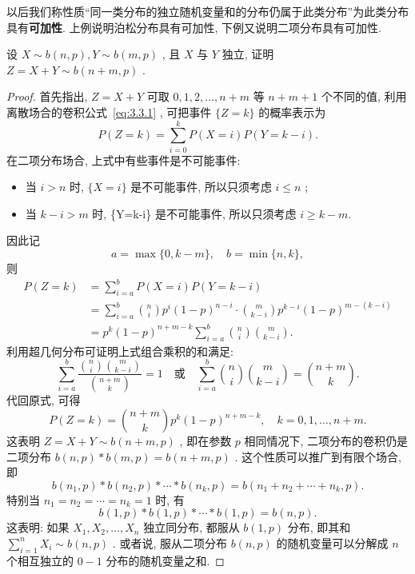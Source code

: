    以后我们称性质“同一类分布的独立随机变量和的分布仍属于此类分布”为此类分布具有{\bfseries 可加性}. 上例说明泊松分布具有可加性, 下例又说明二项分布具有可加性.
   \begin{example}[二项分布的可加性]\label{exam:3.3.3}
   	设 $X\sim b(n,p),Y\sim b(m,p)$ , 且 $X$ 与 $Y$ 独立, 证明 $Z=X+Y\sim b(n+m,p)$ .
   	\begin{proof}
   		首先指出, $Z=X+Y$ 可取 $0,1,2,\ldots,n+m$ 等 $n+m+1$ 个不同的值, 利用离散场合的卷积公式~\ref{eq:3.3.1} , 可把事件 $\{Z=k\}$ 的概率表示为
   		\begin{equation*}
   			P(Z=k)=\sum_{i=0}^{k}P(X=i)P(Y=k-i).
   		\end{equation*}
   		在二项分布场合, 上式中有些事件是不可能事件:
   		\begin{itemize}
   			\item 当 $i>n$ 时, $\{X=i\}$ 是不可能事件, 所以只须考虑 $i\leqslant n$ ;
   			\item 当 $k-i>m$ 时, \{Y=k-i\} 是不可能事件, 所以只须考虑 $i\geqslant k-m$.
   		\end{itemize}
   		因此记
   		\begin{equation*}
   			a=\max\{0,k-m\},\quad b=\min\{n,k\},
   		\end{equation*}
   		则
   		\begin{align*}
   			P(Z=k)
   			&= \sum_{i=a}^{b}P(X=i)P(Y=k-i)\\
   			&= \sum_{i=a}^{b}\binom{n}{i}p^{i}(1-p)^{n-i}\cdot\binom{m}{k-i}p^{k-i}(1-p)^{m-(k-i)}\\
   			&= p^{k}(1-p)^{n+m-k}\sum_{i=a}^{b}\binom{n}{i}\binom{m}{k-i}.
   		\end{align*}
   		利用超几何分布可证明上式组合乘积的和满足:
   		\begin{equation*}
   			\sum_{i=a}^{b}\frac{\displaystyle\binom{n}{i}\binom{m}{k-i}}{\displaystyle\binom{n+m}{k}}=1\quad\text{或}\quad\sum_{i=a}^{b}\binom{n}{i}\binom{m}{k-i}=\binom{n+m}{k}.
   		\end{equation*}
   		代回原式, 可得
   		\begin{equation*}
   			P(Z=k)=\binom{n+m}{k}p^k(1-p)^{n+m-k},\quad k=0,1,\ldots,n+m.
   		\end{equation*}
   		这表明 $Z=X+Y\sim b(n+m,p)$ , 即在参数 $p$ 相同情况下, 二项分布的卷积仍是二项分布 $b(n,p)\ast b(m,p)=b(n+m,p)$ . 这个性质可以推广到有限个场合, 即
   		\begin{equation}
   			b(n_1,p)\ast b(n_2,p)\ast\cdots\ast b(n_k,p)=b(n_1+n_2+\cdots+n_k,p).\label{eq:3.3.5}
   		\end{equation}
   		特别当 $n_1=n_2=\cdots=n_k=1$ 时, 有
   		\begin{equation}
   			b(1,p)\ast b(1,p)\ast \cdots\ast b(1,p)=b(n,p).\label{eq:3.3.6}
   		\end{equation}
   		这表明: 如果 $X_1,X_2,\ldots,X_n$ 独立同分布, 都服从 $b(1,p)$ 分布, 即其和 $\displaystyle\sum_{i=1}^{n}X_i\sim b(n,p)$ . 或者说, 服从二项分布 $b(n,p)$ 的随机变量可以分解成 $n$ 个相互独立的 $0-1$ 分布的随机变量之和.
   	\end{proof}
   \end{example}
   
